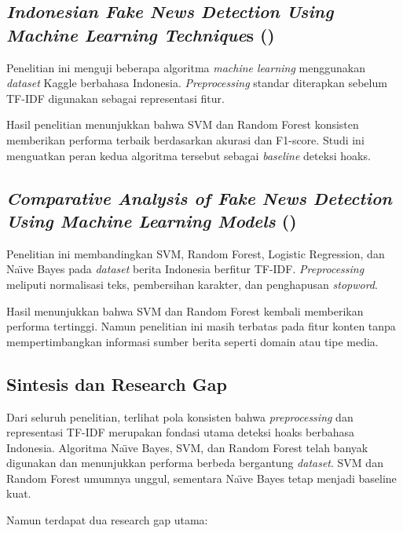 \subsection{\textit{Indonesian Fake News Detection Using Machine Learning Technique}s (\textcite{triyono2023indonesian})}

Penelitian ini menguji beberapa algoritma \textit{machine learning} menggunakan \textit{dataset} Kaggle berbahasa Indonesia. \textit{Preprocessing} standar diterapkan sebelum TF-IDF digunakan sebagai representasi fitur.

Hasil penelitian menunjukkan bahwa SVM dan Random Forest konsisten memberikan performa terbaik berdasarkan akurasi dan F1-score. Studi ini menguatkan peran kedua algoritma tersebut sebagai \textit{baseline} deteksi hoaks.

\subsection{\textit{Comparative Analysis of Fake News Detection Using Machine Learning Models} (\textcite{safira2023comparative})}

Penelitian ini membandingkan SVM, Random Forest, Logistic Regression, dan Na\"{\i}ve Bayes pada \textit{dataset} berita Indonesia berfitur TF-IDF. \textit{Preprocessing} meliputi normalisasi teks, pembersihan karakter, dan penghapusan \textit{stopword}.

Hasil menunjukkan bahwa SVM dan Random Forest kembali memberikan performa tertinggi. Namun penelitian ini masih terbatas pada fitur konten tanpa mempertimbangkan informasi sumber berita seperti domain atau tipe media.

\subsection{Sintesis dan Research Gap}

Dari seluruh penelitian, terlihat pola konsisten bahwa \textit{preprocessing} dan representasi TF-IDF merupakan fondasi utama deteksi hoaks berbahasa Indonesia. Algoritma Na\"{\i}ve Bayes, SVM, dan Random Forest telah banyak digunakan dan menunjukkan performa berbeda bergantung \textit{dataset}. SVM dan Random Forest umumnya unggul, sementara Na\"{\i}ve Bayes tetap menjadi baseline kuat.

Namun terdapat dua research gap utama:

